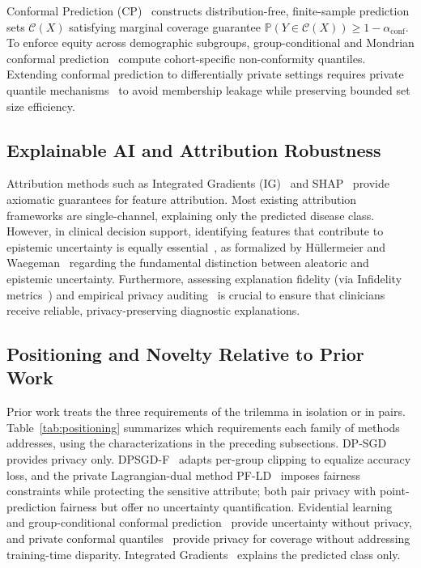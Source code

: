 \documentclass[3p,12pt]{elsarticle}
\theoremstyle{plain}
\theoremstyle{definition}
\begin{document}
Conformal Prediction (CP)~\cite{vovk2005algorithmic,angelopoulos2021gentle,tibshirani2019conformal} constructs distribution-free, finite-sample prediction sets $\mathcal{C}(X)$ satisfying marginal coverage guarantee $\mathbb{P}(Y \in \mathcal{C}(X)) \ge 1 - \alpha_{\text{conf}}$. To enforce equity across demographic subgroups, group-conditional and Mondrian conformal prediction~\cite{vovk2003mondrian,romano2020malice,sesia2020conformal,gibbs2023conformal} compute cohort-specific non-conformity quantiles. Extending conformal prediction to differentially private settings requires private quantile mechanisms~\cite{angelopoulos2021private} to avoid membership leakage while preserving bounded set size efficiency.

\subsection{Explainable AI and Attribution Robustness}
Attribution methods such as Integrated Gradients (IG)~\cite{sundararajan2017axiomatic} and SHAP~\cite{lundberg2017unified} provide axiomatic guarantees for feature attribution. Most existing attribution frameworks are single-channel, explaining only the predicted disease class. However, in clinical decision support, identifying features that contribute to epistemic uncertainty is equally essential~\cite{antoran2021clue,perez2022attribution}, as formalized by H{\"u}llermeier and Waegeman~\cite{hullermeier2021aleatoric} regarding the fundamental distinction between aleatoric and epistemic uncertainty. Furthermore, assessing explanation fidelity (via Infidelity metrics~\cite{yeh2019infidelity}) and empirical privacy auditing~\cite{patel2022towards,shokri2017membership,yeom2018privacy,carlini2022membership} is crucial to ensure that clinicians receive reliable, privacy-preserving diagnostic explanations.

\subsection{Positioning and Novelty Relative to Prior Work}
\label{sec:novelty}
Prior work treats the three requirements of the trilemma in isolation or in pairs. Table~\ref{tab:positioning} summarizes which requirements each family of methods addresses, using the characterizations in the preceding subsections. DP-SGD~\cite{abadi2016deep} provides privacy only. DPSGD-F~\cite{xu2021removing} adapts per-group clipping to equalize accuracy loss, and the private Lagrangian-dual method PF-LD~\cite{tran2021differentially} imposes fairness constraints while protecting the sensitive attribute; both pair privacy with point-prediction fairness but offer no uncertainty quantification. Evidential learning~\cite{sensoy2018evidential} and group-conditional conformal prediction~\cite{vovk2003mondrian,romano2020malice} provide uncertainty without privacy, and private conformal quantiles~\cite{angelopoulos2021private} provide privacy for coverage without addressing training-time disparity. Integrated Gradients~\cite{sundararajan2017axiomatic} explains the predicted class only.
\end{document}

